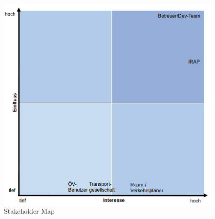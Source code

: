 \begin{figure}[ht]
\centering
\includegraphics[width=0.7\linewidth]{projectdoc/img/stakeholder_map}
\caption[Stakeholder Map]{Stakeholder Map}
\label{fig:stakeholder_map}
\end{figure}



